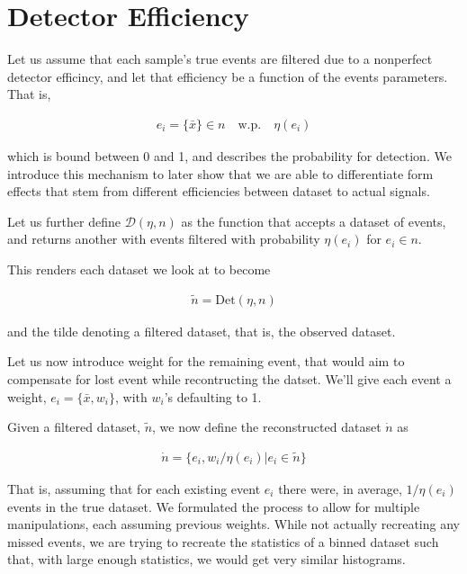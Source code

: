 \documentclass{article}
\begin{document}
\section{Detector Efficiency}

Let us assume that each sample's true events are filtered due to a nonperfect detector efficincy, and let that efficiency be a function of the events parameters. That is,

$$
\begin{aligned}
e_i = \{\bar{x}\} \in n \quad \text{w.p.} \quad \eta(e_i)
\end{aligned}
$$

which is bound between 0 and 1, and describes the probability for detection. We introduce this mechanism to later show that we are able to differentiate form effects that stem from different efficiencies between dataset to actual signals.

Let us further define $\mathcal{D}(\eta, n)$ as the function that accepts a dataset of events, and returns another with events filtered with probability $\eta(e_i)$ for $e_i \in n$.

This renders each dataset we look at to become

$$
\begin{aligned}
    \tilde{n} = \text{Det}(\eta, n)
\end{aligned}
$$

and the tilde denoting a filtered dataset, that is, the observed dataset.

Let us now introduce weight for the remaining event, that would aim to compensate for lost event while recontructing the datset. We'll give each event a weight, $e_i = \{\bar{x}, w_i\}$, with $w_i$'s defaulting to 1.

Given a filtered dataset, $\tilde{n}$, we now define the reconstructed dataset $\dot{n}$ as

$$
\begin{aligned}
    \dot{n} = \{ e_i, w_i / \eta(e_i) | e_i \in \tilde{n} \}
\end{aligned}
$$

That is, assuming that for each existing event $e_i$ there were, in average, $1/\eta(e_i)$ events in the true dataset. We formulated the process to allow for multiple manipulations, each assuming previous weights. While not actually recreating any missed events, we are trying to recreate the statistics of a binned dataset such that, with large enough statistics, we would get very similar histograms.
\end{document}

